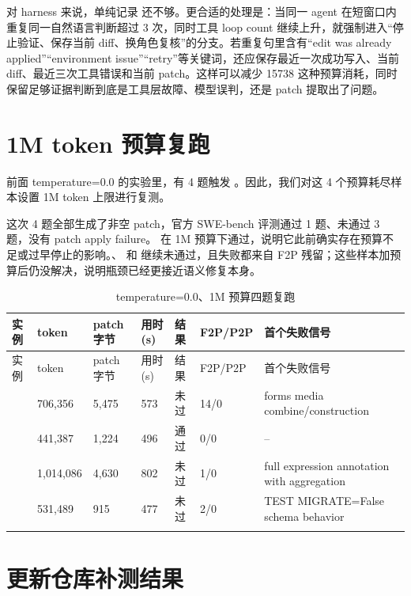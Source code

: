 \documentclass[UTF8,a4paper,11pt]{ctexart}
\begin{document}
对 harness 来说，单纯记录  还不够。更合适的处理是：当同一 agent 在短窗口内重复同一自然语言判断超过 3 次，同时工具 loop count 继续上升，就强制进入“停止验证、保存当前 diff、换角色复核”的分支。若重复句里含有“edit was already applied”“environment issue”“retry”等关键词，还应保存最近一次成功写入、当前 diff、最近三次工具错误和当前 patch。这样可以减少 15738 这种预算消耗，同时保留足够证据判断到底是工具层故障、模型误判，还是 patch 提取出了问题。

\section{1M token 预算复跑}

前面 temperature=0.0 的实验里，有 4 题触发 。因此，我们对这 4 个预算耗尽样本设置 1M token 上限进行复测。

这次 4 题全部生成了非空 patch，官方 SWE-bench 评测通过 1 题、未通过 3 题，没有 patch apply failure。 在 1M 预算下通过，说明它此前确实存在预算不足或过早停止的影响。、 和  继续未通过，且失败都来自 F2P 残留；这些样本加预算后仍没解决，说明瓶颈已经更接近语义修复本身。

\begin{center}
{\scriptsize
\setlength{\tabcolsep}{3pt}
\begin{longtable}{L{3.6cm} C{1.65cm} C{1.35cm} C{1.1cm} C{1.0cm} C{1.55cm} L{4.25cm}}
\toprule
实例 & token & patch字节 & 用时(s) & 结果 & F2P/P2P & 首个失败信号 \\
\midrule
\endfirsthead
\toprule
实例 & token & patch字节 & 用时(s) & 结果 & F2P/P2P & 首个失败信号 \\
\midrule
\endhead
{} & 706,356 & 5,475 & 573 & 未过 & 14/0 & forms media combine/construction \\
 & 441,387 & 1,224 & 496 & 通过 & 0/0 & -- \\
 & 1,014,086 & 4,630 & 802 & 未过 & 1/0 & full expression annotation with aggregation \\
 & 531,489 & 915 & 477 & 未过 & 2/0 & TEST MIGRATE=False schema behavior \\
\bottomrule
\caption{temperature=0.0、1M 预算四题复跑}
\end{longtable}
}
\end{center}

\section{更新仓库补测结果}
\end{document}
